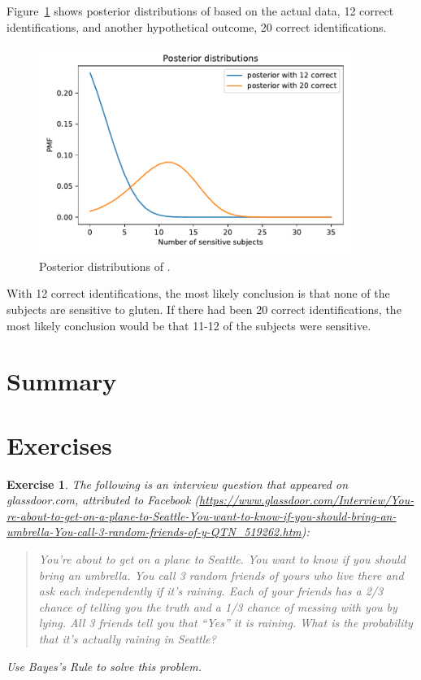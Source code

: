 \documentclass[12pt]{book}
\theoremstyle{exercise}
\newtheorem{exercise}{Exercise}[chapter]
\begin{document}
Figure~\ref{fig05-04} shows posterior distributions of  based on the actual data, 12 correct identifications, and another hypothetical outcome, 20 correct identifications.

\begin{figure}
\centerline{\includegraphics[width=4in]{figs/fig05-04.pdf}}
\caption{Posterior distributions of .}
\label{fig05-04}
\end{figure}

With 12 correct identifications, the most likely conclusion is that none of the subjects are sensitive to gluten.
If there had been 20 correct identifications, the most likely conclusion would be that 11-12 of the subjects were sensitive.


\section{Summary}

\section{Exercises}

\begin{exercise}
The following is an interview question that appeared on glassdoor.com, attributed to Facebook (\url{https://www.glassdoor.com/Interview/You-re-about-to-get-on-a-plane-to-Seattle-You-want-to-know-if-you-should-bring-an-umbrella-You-call-3-random-friends-of-y-QTN_519262.htm}):

\begin{quote}
You're about to get on a plane to Seattle. You want to know if you should bring an umbrella. You call 3 random friends of yours who live there and ask each independently if it's raining. Each of your friends has a 2/3 chance of telling you the truth and a 1/3 chance of messing with you by lying. All 3 friends tell you that ``Yes'' it is raining. What is the probability that it's actually raining in Seattle?
\end{quote}

Use Bayes's Rule to solve this problem.
\end{exercise}
\end{document}
